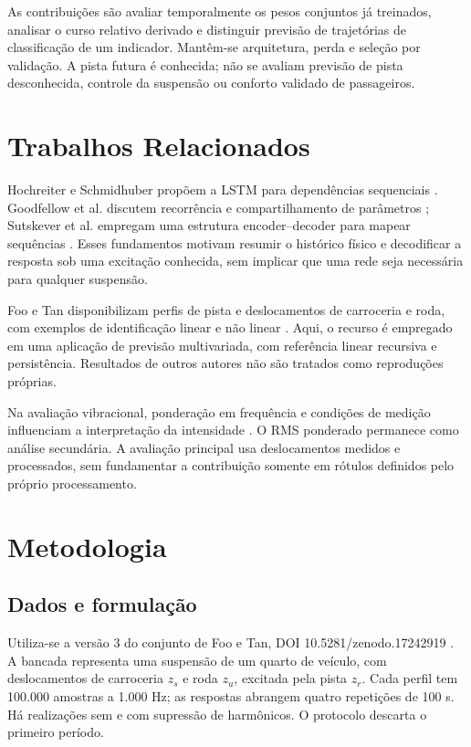 \documentclass[conference]{IEEEtran}
\begin{document}
As contribuições são avaliar temporalmente os pesos conjuntos já treinados, analisar o curso relativo derivado e distinguir previsão de trajetórias de classificação de um indicador. Mantêm-se arquitetura, perda e seleção por validação. A pista futura é conhecida; não se avaliam previsão de pista desconhecida, controle da suspensão ou conforto validado de passageiros.

\section{Trabalhos Relacionados}
Hochreiter e Schmidhuber propõem a LSTM para dependências sequenciais \cite{lstm}. Goodfellow et al. discutem recorrência e compartilhamento de parâmetros \cite{goodfellow}; Sutskever et al. empregam uma estrutura encoder--decoder para mapear sequências \cite{seq2seq}. Esses fundamentos motivam resumir o histórico físico e decodificar a resposta sob uma excitação conhecida, sem implicar que uma rede seja necessária para qualquer suspensão.

Foo e Tan disponibilizam perfis de pista e deslocamentos de carroceria e roda, com exemplos de identificação linear e não linear \cite{dataset}. Aqui, o recurso é empregado em uma aplicação de previsão multivariada, com referência linear recursiva e persistência. Resultados de outros autores não são tratados como reproduções próprias.

Na avaliação vibracional, ponderação em frequência e condições de medição influenciam a interpretação da intensidade \cite{comfort,vasquez}. O RMS ponderado permanece como análise secundária. A avaliação principal usa deslocamentos medidos e processados, sem fundamentar a contribuição somente em rótulos definidos pelo próprio processamento.

\section{Metodologia}
\subsection{Dados e formulação}
Utiliza-se a versão 3 do conjunto de Foo e Tan, DOI 10.5281/zenodo.17242919 \cite{dataset}. A bancada representa uma suspensão de um quarto de veículo, com deslocamentos de carroceria $z_s$ e roda $z_u$, excitada pela pista $z_r$. Cada perfil tem 100.000 amostras a 1.000 Hz; as respostas abrangem quatro repetições de 100 s. Há realizações sem e com supressão de harmônicos. O protocolo descarta o primeiro período.
\end{document}
